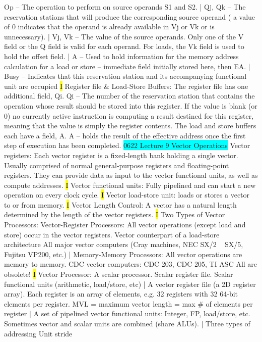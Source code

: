 \documentclass[fontsize=4pt]{scrartcl}
\begin{document}
Op – The operation to perform on source operands S1 and S2. | Qj, Qk – The reservation stations that will produce the corresponding source operand ( a value of 0 indicates that the operand is already available in Vj or Vk or is unnecessary). | Vj, Vk – The value of the source operands.  Only one of the V field or the Q field is valid for each operand.  For  loads, the Vk field is used to hold the offset field. | A – Used to hold information for the memory address calculation for a load or store – immediate field initially stored here, then EA. | Busy – Indicates that this reservation station and its accompanying functional unit are occupied
\hl{I}
Register file & Load-Store Buffers: The register file has one additional field, Qi. Qi – The number of the reservation station that contains the operation whose result should be stored into this register.  If the value is blank (or 0) no currently active instruction is computing a result destined for this register, meaning that the value is simply the register contents. The load and store buffers each have a field,  A. A – holds the result of the effective address once the first step of execution has been completed.
\colorbox{Cyan}{0622 Lecture 9 Vector Operations} Vector registers: Each vector register is a fixed-length bank holding a single vector. Usually comprised of normal general-purpose registers and floating-point registers. They can provide data as input to the vector functional units, as well as compute addresses.
\hl{I}
Vector functional units: Fully pipelined and can start a new operation on every clock cycle.
\hl{I}
Vector load-store unit: loads or stores a vector to or from memory.
\hl{I}
Vector Length Control: A vector has a natural length determined by the length of the vector registers.
\hl{I} Two Types of Vector Processors: Vector-Register Processors: All vector operations (except load and store) occur in the vector registers. Vector counterpart of a load-store architecture All major vector computers (Cray machines, NEC SX/2 ~ SX/5, Fujitsu VP200, etc.) | Memory-Memory Processors: All vector operations are memory to memory. CDC vector computers: CDC 203, CDC 205, TI ASC All are obsolete!
\hl{I}
Vector Processor: A scalar processor. Scalar register file. Scalar functional units (arithmetic, load/store, etc) |
A vector register file (a 2D register array). Each register is an array of elements, e.g. 32 registers with 32 64-bit elements per register. MVL = maximum vector length = max \# of elements per register | A set of pipelined vector functional units: Integer, FP, load/store, etc. Sometimes vector and scalar units are combined (share ALUs). | Three types of addressing Unit stride
\end{document}
